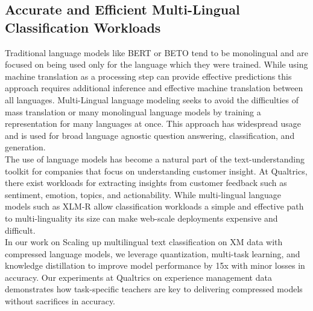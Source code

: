 \subsection{Accurate and Efficient Multi-Lingual Classification Workloads}
Traditional language models like BERT \cite{Devlin2019BERTPO} or BETO \cite{canete-etal-2022-albeto} tend to be monolingual and are focused on being used only for the language which they were trained. While using machine translation as a processing step can provide effective predictions \cite{Isbister2021ShouldWS} this approach requires additional inference and effective machine translation between all languages. Multi-Lingual language modeling seeks to avoid the difficulties of mass translation or many monolingual language models by training a representation for many languages at once. This approach has widespread usage and is used for broad language agnostic question answering, classification, and generation. \\
The use of language models has become a natural part of the text-understanding toolkit for companies that focus on understanding customer insight. At Qualtrics, there exist workloads for extracting insights from customer feedback such as sentiment, emotion, topics, and actionability. While multi-lingual language models such as XLM-R \cite{Conneau2020UnsupervisedCR} allow classification workloads a simple and effective path to multi-linguality its size can make web-scale deployments expensive and difficult. \\ 
In our work on Scaling up multilingual text classification on XM data with compressed language
models, \cite{Campos2022ScalM} we leverage quantization, multi-task learning, and knowledge distillation to improve model performance by 15x with minor losses in accuracy. Our experiments at Qualtrics on experience management data demonstrates how task-specific teachers are key to delivering compressed models without sacrifices in accuracy.
